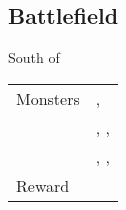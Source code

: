 \subsection{Battlefield}
\label{map:battlefield_06}

South of 

\noindent\begin{tabularx}{\textwidth}[l]{lX}
	Monsters
	& \nameref{monster:scorpion}, \nameref{monster:scorpion} \\
	& \nameref{monster:giant_toad}, \nameref{monster:giant_toad}, \nameref{monster:mint_mint} \\
	& \nameref{monster:scorpion}, \nameref{monster:scorpion}, \nameref{monster:mint_mint}
\\ \hline
	Reward & \nameref{armor:magic_ring}
\end{tabularx}
